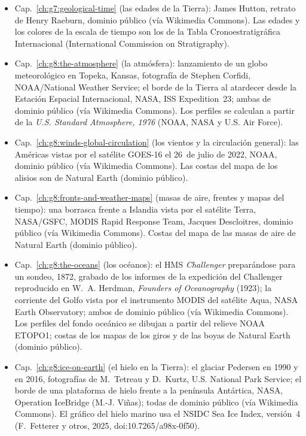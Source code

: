 \begin{itemize}
  \item Cap.~\ref{ch:g7:geological-time} (las edades de la Tierra): James Hutton, retrato de Henry Raeburn, dominio público (vía Wikimedia Commons). Las edades y los colores de la escala de tiempo son los de la Tabla Cronoestratigráfica Internacional (International Commission on Stratigraphy).
  \item Cap.~\ref{ch:g8:the-atmosphere} (la atmósfera): lanzamiento de un globo meteorológico en Topeka, Kansas, fotografía de Stephen Corfidi, NOAA/National Weather Service; el borde de la Tierra al atardecer desde la Estación Espacial Internacional, NASA, ISS Expedition~23; ambas de dominio público (vía Wikimedia Commons). Los perfiles se calculan a partir de la \emph{U.S. Standard Atmosphere, 1976} (NOAA, NASA y U.S. Air Force).
  \item Cap.~\ref{ch:g8:winds-global-circulation} (los vientos y la circulación general): las Américas vistas por el satélite GOES-16 el 26~de julio de 2022, NOAA, dominio público (vía Wikimedia Commons). Las costas del mapa de los alisios son de Natural Earth (dominio público).
  \item Cap.~\ref{ch:g8:fronts-and-weather-maps} (masas de aire, frentes y mapas del tiempo): una borrasca frente a Islandia vista por el satélite Terra, NASA/GSFC, MODIS Rapid Response Team, Jacques Descloitres, dominio público (vía Wikimedia Commons). Costas del mapa de las masas de aire de Natural Earth (dominio público).
  \item Cap.~\ref{ch:g8:the-oceans} (los océanos): el HMS \emph{Challenger} preparándose para un sondeo, 1872, grabado de los informes de la expedición del Challenger reproducido en W.~A. Herdman, \emph{Founders of Oceanography} (1923); la corriente del Golfo vista por el instrumento MODIS del satélite Aqua, NASA Earth Observatory; ambos de dominio público (vía Wikimedia Commons). Los perfiles del fondo oceánico se dibujan a partir del relieve NOAA ETOPO1; costas de los mapas de los giros y de las boyas de Natural Earth (dominio público).
  \item Cap.~\ref{ch:g8:ice-on-earth} (el hielo en la Tierra): el glaciar Pedersen en 1990 y en 2016, fotografías de M.~Tetreau y D.~Kurtz, U.S. National Park Service; el borde de una plataforma de hielo frente a la península Antártica, NASA, Operation IceBridge (M.-J. Viñas); todas de dominio público (vía Wikimedia Commons). El gráfico del hielo marino usa el NSIDC Sea Ice Index, versión~4 (F.~Fetterer y otros, 2025, doi:10.7265/a98x-0f50).

\end{itemize}
